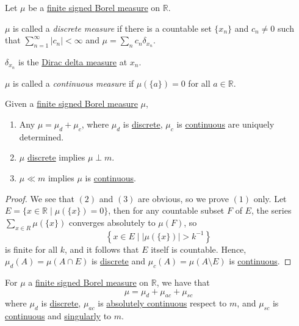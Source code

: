 \begin{definition*}
	Let \(\mu\) be a \hyperref[def:finite-signed-measure]{finite signed \hyperref[def:Borel-measure]{Borel measure}} on \(\mathbb{R}\).
	\begin{definition}\label{def:discrete-measure}
		\(\mu\) is called a \emph{discrete measure} if there is a countable set \(\{x_n\}\) and \(c_n \neq 0\) such that \(\sum_{n=1}^\infty \left\vert c_n \right\vert < \infty\)
		and \(\mu = \sum_n c_n \delta_{x_n}\).
		\begin{note}
			\(\delta_{x_n}\) is the \hyperref[eg:Dirac-Delta measure]{Dirac delta measure} at \(x_n\).
		\end{note}
	\end{definition}
	\begin{definition}\label{def:continuous-measure}
		\(\mu\) is called a \emph{continuous measure} if \(\mu(\{a\}) = 0\) for all \(a \in \mathbb{R}\).
	\end{definition}
\end{definition*}


\begin{lemma}
	Given a \hyperref[def:finite-signed-measure]{finite signed \hyperref[def:Borel-measure]{Borel measure}} \(\mu\),
	\begin{enumerate}[(1)]
		\item Any \(\mu = \mu_d + \mu_c\), where \(\mu_d\) is \hyperref[def:discrete-measure]{discrete}, \(\mu_c\) is \hyperref[def:continuous-measure]{continuous}
		      are uniquely determined.
		\item \(\mu\) \hyperref[def:discrete-measure]{discrete} implies \(\mu \perp m\).
		\item \(\mu \ll m\) implies \(\mu\) is \hyperref[def:continuous-measure]{continuous}.
	\end{enumerate}
\end{lemma}
\begin{proof}
	We see that \((2)\) and \((3)\) are obvious, so we prove \((1)\) only. Let \(E = \{x\in \mathbb{R} \mid \mu (\{x\}) = 0\}\), then
	for any countable subset \(F\) of \(E\), the series \(\sum_{x\in R}^{} \mu (\{x\})\) converges absolutely to \(\mu (F)\), so
	\[
		\left\{x\in E\mid \left\vert \mu (\{x\}) \right\vert > k^{-1} \right\}
	\]
	is finite for all \(k\), and it follows that \(E\) itself is countable. Hence, \(\mu _{d} (A) = \mu (A \cap E)\) is \hyperref[def:discrete-measure]{discrete}
	and \(\mu _{c} (A) = \mu (A \setminus E)\) is \hyperref[def:continuous-measure]{continuous}.
\end{proof}

\begin{corollary}
	For \(\mu \) a \hyperref[def:finite-signed-measure]{finite signed \hyperref[def:Borel-measure]{Borel measure}} on \(\mathbb{R}\), we have that
	\[
		\mu = \mu_d + \mu_{ac} + \mu_{sc}
	\]
	where \(\mu_d\) is \hyperref[def:discrete-measure]{discrete}, \(\mu_{ac}\) is \hyperref[def:absolutely-continuous-function]{absolutely continuous} respect to \(m\),
	and \(\mu_{sc}\) is \hyperref[def:continuous-measure]{continuous} and \hyperref[def:singular]{singularly} to \(m\).
\end{corollary}
